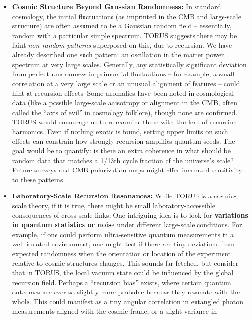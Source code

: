 \documentclass[
]{article}
\begin{document}
{\begin{itemize}
\item
  \textbf{Cosmic Structure Beyond Gaussian Randomness:} In standard
  cosmology, the initial fluctuations (as imprinted in the CMB and
  large-scale structure) are often assumed to be a Gaussian random field
  -- essentially, random with a particular simple spectrum. TORUS
  suggests there may be faint \emph{non-random patterns} superposed on
  this, due to recursion. We have already described one such pattern: an
  oscillation in the matter power spectrum at very large
  scales\hspace{0pt}. Generally, any statistically significant deviation
  from perfect randomness in primordial fluctuations -- for example, a
  small correlation at a very large scale or an unusual alignment of
  features -- could hint at recursion effects. Some anomalies have been
  noted in cosmological data (like a possible large-scale anisotropy or
  alignment in the CMB, often called the ``axis of evil'' in cosmology
  folklore), though none are confirmed. TORUS would encourage us to
  re-examine these with the lens of recursion harmonics. Even if nothing
  exotic is found, setting upper limits on such effects can constrain
  how strongly recursion amplifies quantum seeds. The goal would be to
  quantify: is there an extra coherence in what should be random data
  that matches a 1/13th cycle fraction of the universe's scale? Future
  surveys and CMB polarization maps might offer increased sensitivity to
  these patterns.
\item
  \textbf{Laboratory-Scale Recursion Resonances:} While TORUS is a
  cosmic-scale theory, if it is true, there might be small
  laboratory-accessible consequences of cross-scale links. One
  intriguing idea is to look for \textbf{variations in quantum
  statistics or noise} under different large-scale conditions. For
  example, if one could perform ultra-sensitive quantum measurements in
  a well-isolated environment, one might test if there are tiny
  deviations from expected randomness when the orientation or location
  of the experiment relative to cosmic structures changes. This sounds
  far-fetched, but consider that in TORUS, the local vacuum state could
  be influenced by the global recursion field. Perhaps a ``recursion
  bias'' exists, where certain quantum outcomes are ever so slightly
  more probable because they resonate with the whole. This could
  manifest as a tiny angular correlation in entangled photon
  measurements aligned with the cosmic frame, or a slight variance in

\end{itemize}}
\end{document}
